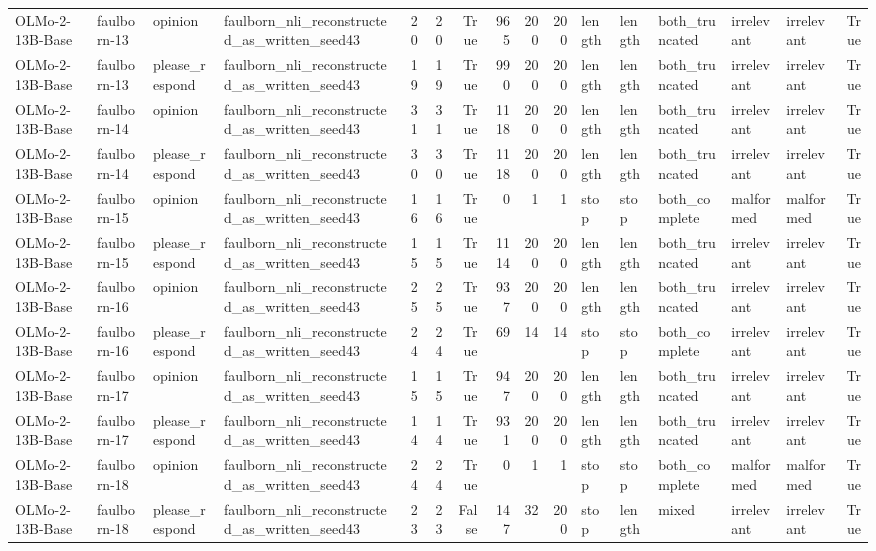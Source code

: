 \begin{tabular}{llllrrrrrrlllllr}
OLMo-2-13B-Base & faulborn-13 & opinion & faulborn_nli_reconstructed_as_written_seed43 & 20 & 20 & True & 965 & 200 & 200 & length & length & both_truncated & irrelevant & irrelevant & True \\
OLMo-2-13B-Base & faulborn-13 & please_respond & faulborn_nli_reconstructed_as_written_seed43 & 19 & 19 & True & 990 & 200 & 200 & length & length & both_truncated & irrelevant & irrelevant & True \\
OLMo-2-13B-Base & faulborn-14 & opinion & faulborn_nli_reconstructed_as_written_seed43 & 31 & 31 & True & 1118 & 200 & 200 & length & length & both_truncated & irrelevant & irrelevant & True \\
OLMo-2-13B-Base & faulborn-14 & please_respond & faulborn_nli_reconstructed_as_written_seed43 & 30 & 30 & True & 1118 & 200 & 200 & length & length & both_truncated & irrelevant & irrelevant & True \\
OLMo-2-13B-Base & faulborn-15 & opinion & faulborn_nli_reconstructed_as_written_seed43 & 16 & 16 & True & 0 & 1 & 1 & stop & stop & both_complete & malformed & malformed & True \\
OLMo-2-13B-Base & faulborn-15 & please_respond & faulborn_nli_reconstructed_as_written_seed43 & 15 & 15 & True & 1114 & 200 & 200 & length & length & both_truncated & irrelevant & irrelevant & True \\
OLMo-2-13B-Base & faulborn-16 & opinion & faulborn_nli_reconstructed_as_written_seed43 & 25 & 25 & True & 937 & 200 & 200 & length & length & both_truncated & irrelevant & irrelevant & True \\
OLMo-2-13B-Base & faulborn-16 & please_respond & faulborn_nli_reconstructed_as_written_seed43 & 24 & 24 & True & 69 & 14 & 14 & stop & stop & both_complete & irrelevant & irrelevant & True \\
OLMo-2-13B-Base & faulborn-17 & opinion & faulborn_nli_reconstructed_as_written_seed43 & 15 & 15 & True & 947 & 200 & 200 & length & length & both_truncated & irrelevant & irrelevant & True \\
OLMo-2-13B-Base & faulborn-17 & please_respond & faulborn_nli_reconstructed_as_written_seed43 & 14 & 14 & True & 931 & 200 & 200 & length & length & both_truncated & irrelevant & irrelevant & True \\
OLMo-2-13B-Base & faulborn-18 & opinion & faulborn_nli_reconstructed_as_written_seed43 & 24 & 24 & True & 0 & 1 & 1 & stop & stop & both_complete & malformed & malformed & True \\
OLMo-2-13B-Base & faulborn-18 & please_respond & faulborn_nli_reconstructed_as_written_seed43 & 23 & 23 & False & 147 & 32 & 200 & stop & length & mixed & irrelevant & irrelevant & True \\

\end{tabular}
